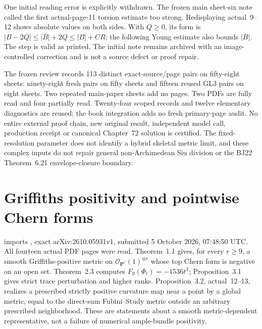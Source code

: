 One initial reading error is explicitly withdrawn. The frozen
main sheet-six note called the first actual-page-11 torsion
estimate too strong. Redisplaying actual~9--12 shows absolute
values on both sides. With \(Q\geq0\), its form is
\(|B-2Q|\leq|B|+2Q\leq|B|+CR\); the following Young estimate
also bounds \(|B|\). The step is valid as printed. The initial
note remains archived with an image-controlled correction and
is not a source defect or proof repair.

The frozen review records 113 distinct exact-source/page pairs
on fifty-eight sheets: ninety-eight fresh pairs on fifty sheets
and fifteen reused GL3 pairs on eight sheets. Two repeated
main-paper sheets add no pages. Two PDFs are fully read and
four partially read. Twenty-four scoped records and twelve
elementary diagnostics are reused; the book integration adds
no fresh primary-page audit. No entire external proof chain,
new original result, independent model call, production receipt
or canonical Chapter~72 solution is certified. The fixed-resolution
parameter does not identify a hybrid skeletal metric limit, and
these complex inputs do not repair general non-Archimedean Siu
division or the BJ22 Theorem~6.21 envelope-closure boundary.

\section{Griffiths positivity and pointwise Chern forms}
\label{sec:provenance-Griffiths-Chern}

 imports
\cite{Du26GriffithsTopChernV1}, exact arXiv:2610.05931v1,
submitted 5 October 2026, 07:48:50 UTC. All fourteen actual PDF
pages were read. Theorem~1.1 gives, for every $r\geq9$, a smooth
Griffiths-positive metric on $\mathcal O_{\mathbf P^r}(1)^{\oplus r}$
whose top Chern form is negative on an open set. Theorem~2.3 computes
$F_9(\Phi_t)=-1536t^3$; Proposition~3.1 gives strict trace perturbation
and higher ranks. Proposition~3.2, actual~12--13, realizes a prescribed
strictly positive curvature map near a point by a global metric,
equal to the direct-sum Fubini--Study metric outside an arbitrary
prescribed neighborhood. These are statements about a smooth
metric-dependent representative, not a failure of numerical
ample-bundle positivity.

